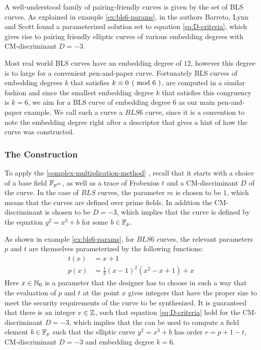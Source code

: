 A well-understood family of pairing-friendly curves is given by the set of BLS curves. As explained in example \ref{ex:bls6-params}, in \cite{bls-02} the authors Barreto, Lynn and Scott found a parameterized solution set to equation \ref{eq:D-criteria}, which gives rise to pairing friendly elliptic curves of various embedding degrees with CM-discriminant $D = -3$. 

Most real world BLS curves have an embedding degree of $12$, however this degree is to large for a convenient pen-and-paper curve. Fortunately BLS curves of embedding degrees $k$ that satisfies $\kongru{k}{0}{6}$, are computed in a similar fashion and since the smallest embedding degree $k$ that satisfies this congruency is $k=6$, we aim for a BLS curve of embedding degree 6 as our main pen-and-paper example. We call such a curve a $BLS6$ curve, since it is a convention to note the embedding degree right after a descriptor that gives a hint of how the curve was constructed.  

\subsubsection{The Construction}
To apply the  \ref{complex-multiplication-method} , recall that it starts with a choice of a base field $\mathbb{F}_{p^m}$, as well as a trace of Frobenius $t$ and a CM-discriminant $D$ of the curve. In the case of $BLS$ curves, the parameter $m$ is chosen to be $1$, which means that the curves are defined over prime fields. In addition the CM-discriminant is chosen to be $D=-3$, which implies that the curve is defined by the equation $y^2 = x^3 +b$ for some $b\in \mathbb{F}_p$. 

As shown in example \ref{ex:bls6-params}, for $BLS6$ curves, the relevant parameters $p$ and $t$ are themselves parameterized by the following functions:
\begin{equation}
\begin{split}
t(x) &= x+1\\
p(x) &= \frac{1}{3}(x-1)^2(x^{2}-x+1) +x
\end{split}
\end{equation}
Here $x\in\mathbb{N}_0$ is a parameter that the designer has to choose in such a way that the evaluation of $p$ and $t$ at the point $x$ gives integers that have the proper size to meet the security requirements of the curve to be synthesized. It is guaranteed that there is an integer $v\in\mathbb{Z}$, such that equation \ref{eq:D-criteria} hold for the CM-discriminant $D=-3$, which implies that the  can be used to compute a field element $b\in\mathbb{F}_p$ such that the elliptic curve $y^2 = x^3 +b$ has order $r=p+1-t$, CM-discriminant $D=-3$ and embedding degree $k=6$. 

